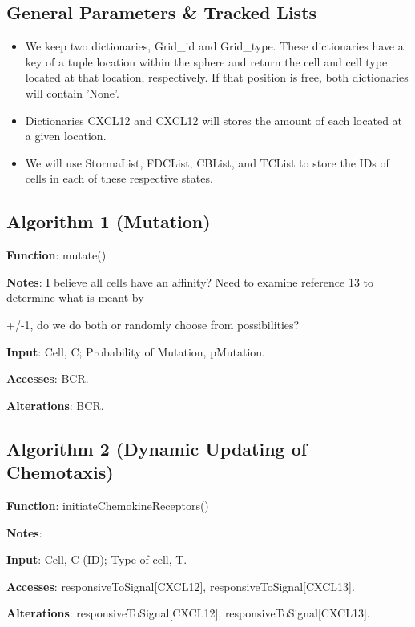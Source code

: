 \documentclass[english]{article}
\begin{document}
\subsection{General Parameters \& Tracked Lists}
\begin{itemize}

\item We keep two dictionaries, Grid\_id and Grid\_type. These dictionaries have a key of a tuple location within the sphere and return the cell and cell type located at that location, respectively. If that position is free, both dictionaries will contain 'None'.

\item Dictionaries CXCL12 and CXCL12 will stores the amount of each located at a given location. 

\item We will use StormaList, FDCList, CBList, and TCList to store the IDs of cells in each of these respective states. 

\end{itemize}

\subsection{Algorithm 1 (Mutation)}	

\textbf{Function}: mutate() 

\textbf{Notes}: I believe all cells have an affinity? Need to examine reference 13 to determine what is meant by 

+/-1, do we do both or randomly choose from possibilities? 


\textbf{Input}: Cell, C; Probability of Mutation, pMutation.

\textbf{Accesses}: BCR.

\textbf{Alterations}: BCR.


\subsection{Algorithm 2 (Dynamic Updating of Chemotaxis)}
\textbf{Function}: initiateChemokineReceptors() 

\textbf{Notes}: 

\textbf{Input}: Cell, C (ID); Type of cell, T.

\textbf{Accesses}: responsiveToSignal[CXCL12], responsiveToSignal[CXCL13].

\textbf{Alterations}: responsiveToSignal[CXCL12], responsiveToSignal[CXCL13].
\\
\end{document}
